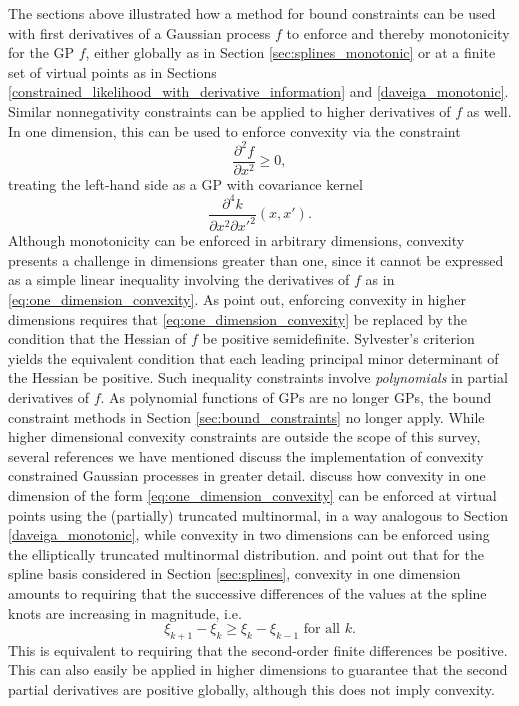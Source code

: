 \label{sec:convexity}
The sections above illustrated how a method for bound constraints can be used with first derivatives of a Gaussian process $f$ to enforce 
 and thereby monotonicity for the GP $f$, either globally as in Section \ref{sec:splines_monotonic} or at a finite set of virtual points as in Sections \ref{constrained_likelihood_with_derivative_information} and \ref{daveiga_monotonic}. Similar nonnegativity constraints can be applied to higher derivatives of $f$ as well. In one dimension, this can be used to enforce convexity via the constraint
\begin{equation}\label{eq:one_dimension_convexity}
\frac{\partial^2 f}{\partial x^2} \ge 0,
\end{equation}
treating the left-hand side as a GP with covariance kernel 
\begin{equation}
\frac{\partial^4 k}{\partial x^2 \partial {x'}^2}(x,x').
\end{equation}
Although monotonicity can be enforced in arbitrary dimensions, convexity presents a challenge in dimensions greater than one, since it cannot be expressed as a simple linear inequality involving the derivatives of $f$ as in \eqref{eq:one_dimension_convexity}.
As  point out, enforcing convexity in higher dimensions requires that \eqref{eq:one_dimension_convexity} be replaced by the condition that the Hessian of $f$ be positive semidefinite. Sylvester's criterion yields the equivalent condition that each leading principal minor determinant of the Hessian be positive. Such inequality constraints involve \emph{polynomials} in partial derivatives of $f$. As polynomial functions of GPs are no longer GPs, the bound constraint methods in Section \ref{sec:bound_constraints} no longer apply. 
While higher dimensional convexity constraints are outside the scope of this survey, several references we have mentioned discuss the implementation of convexity constrained Gaussian processes in greater detail. 
 discuss how convexity in one dimension of the form \eqref{eq:one_dimension_convexity} can be enforced at virtual points
using the (partially) truncated multinormal, in a way analogous to Section \ref{daveiga_monotonic},
while convexity in two dimensions can be enforced using the elliptically truncated multinormal distribution.
 and  point out that for the spline basis considered in Section \ref{sec:splines}, convexity in one dimension amounts to requiring that the successive differences of the values at the spline knots are increasing in magnitude, i.e. 
\begin{equation}
\xi_{k+1}-\xi_{k} \geq \xi_{k}-\xi_{k-1} \text{ for all } k.
\end{equation}
This is equivalent to requiring that the second-order finite differences be positive. This can also easily be applied in higher dimensions to guarantee that the second partial derivatives are positive globally, although this does not imply convexity.

